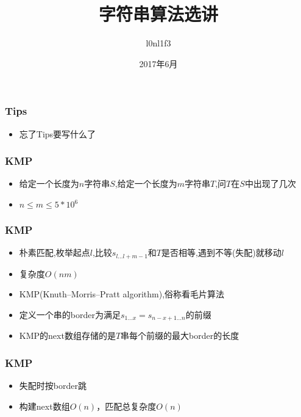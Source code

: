 \documentclass[notheorems]{beamer}
\begin{document}
\title[字符串算法选讲]{字符串算法选讲}
\author[l0nl1f3]{l0nl1f3}
\date[June, 2017]{2017年6月}
\frame{\titlepage}

\begin{frame}
\frametitle{Tips}
\begin{itemize}[]  
\item 忘了Tips要写什么了
\end{itemize}
\end{frame}

\begin{frame}
\frametitle{KMP}
\begin{itemize}[]
\item 给定一个长度为$n$字符串$S$,给定一个长度为$m$字符串$T$,问$T$在$S$中出现了几次 
\pause
\item $n\leq m\leq 5*10^6$
\end{itemize}
\end{frame}

\begin{frame}
\frametitle{KMP}
\begin{itemize}[]
\item 朴素匹配,枚举起点$l$,比较$s_{l\ldots l+m-1}$和$T$是否相等,遇到不等(失配)就移动$l$
\item 复杂度$O(nm)$
\pause
\item KMP(Knuth–Morris–Pratt algorithm),俗称看毛片算法
\pause
\item 定义一个串的border为满足$s_{1\ldots x} = s_{n-x+1\ldots n}$的前缀
\pause
\item KMP的next数组存储的是$T$串每个前缀的最大border的长度
\end{itemize}
\end{frame}

\begin{frame}
\frametitle{KMP}
\begin{itemize}[]
\item 失配时按border跳
\pause
\item 构建next数组$O(n)$，匹配总复杂度$O(n)$
\end{itemize}
\end{frame}
\end{document}
